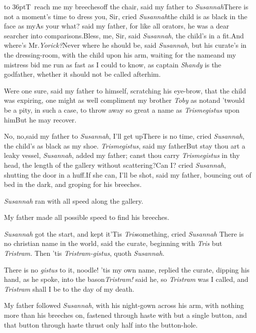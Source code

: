 \documentclass{article}
\begin{document}
\lettrine{\hbox to 36pt{\hskip -3pt\Tsk T}}{\,}
reach me my breeches\break off
the chair, said my father to \textit{Susannah}\tsh There is not a
moment’s time to dress you, Sir, cried
\textit{Susannah}\tsk the child is as black in the face as
my\tsh\pb As your what? said my father, for like all orators,
he was a dear searcher into comparisons.\tsk Bless, me, Sir, said
\textit{Susannah}, the child’s in a fit.\tsk And
where’s Mr.\@ \textit{Yorick?}\tsk Never where he should be,
said \textit{Susannah}, but his curate’s in the dressing-room,
with the child upon his arm, waiting for the name\tsk and my
mistress bid me run as fast as I could to know, as captain
\textit{Shandy} is the godfather, whether it should not be called
after\break him.

Were one sure, said my father to himself, scratching his
eye-brow, that the child was expiring, one might as well compliment
my brother \textit{Toby} as not\tsk\break and ’twould be a pity, in
such a case, to throw away so great a name as
\textit{Trismegistus} upon him\tsk But he may
recover.

\newpage
No, no,\tsk said my father to \textit{Susannah},
I’ll get up\tsk There is no time, cried\break
\textit{Susannah}, the child’s as black as my shoe.
\textit{Trismegistus}, said my father\tsk But
stay\break
\tsk thou art a leaky vessel, \textit{Susannah}, added my
father; canst thou carry \textit{Trismegistus} in thy head, the
length of the gallery without scattering?\tsk Can I? cried
\textit{Susannah}, shutting the door in a huff.\tsk If she
can, I’ll be shot, said my father, bouncing out of bed in the
dark, and groping for his breeches.

\textit{Susannah} ran with all speed along the gallery.

My father made all possible speed to find his breeches.

\textit{Susannah} got the start, and kept it\tsk ’Tis
\textit{Tris}\tsk something, cried \textit{Susannah}\tsk\pb
There is no christian name in the world, said the curate, beginning with
\textit{Tris}\tsk\break
but \textit{Tristram.} Then ’tis
\textit{Tristram-gistus}, quoth \textit{Susannah}.

\tsk There is no \textit{gistus} to it, noodle!\tsk\break
’tis my own name, replied the curate,
dipping his hand, as he spoke, into the\break
bason\tsk \textit{Tristram!} said he, \etc \etc \etc
\etc so \textit{Tristram} was I called, and \textit{Tristram}
shall I be to the day of my death.

My father followed \textit{Susannah}, with his night-gown across
his arm, with nothing more than his breeches on, fastened through
haste with but a single button, and that button through haste
thrust only half into the button-hole.
\end{document}
